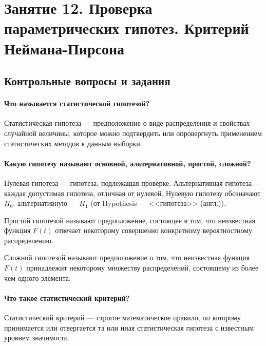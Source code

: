 \chapter*{Занятие 12. Проверка параметрических гипотез. Критерий Неймана-Пирсона}

\section*{Контрольные вопросы и задания}

\subsubsection*{Что называется статистической гипотезой?}

Статистическая гипотеза --- предположение о виде распределения и свойствах случайной величины,
которое можно подтвердить или опровергнуть применением статистических методов к данным выборки.

\subsubsection*{Какую гипотезу называют основной, альтернативной, простой, сложной?}

Нулевая гипотеза --- гипотеза, подлежащая проверке.
Альтернативная гипотеза --- каждая допустимая гипотеза, отличная от нулевой.
Нулевую гипотезу обозначают $H_0$, альтернативную ---
$H_1$ (от Hypothesis --- <<гипотеза>> (англ.)).

Простой гипотезой называют предположение, состоящее в том,
что неизвестная функция $F \left( t \right) $
отвечает некоторому совершенно конкретному вероятностному распределению.

Сложной гипотезой называют предположение о том,
что неизвестная функция $F \left( t \right) $ принадлежит некоторому множеству распределений,
состоящему из более чем одного элемента.

\subsubsection*{Что такое статистический критерий?}

Статистический критерий --- строгое математическое правило,
по которому принимается или отвергается та или иная статистическая
гипотеза с известным уровнем значимости.

